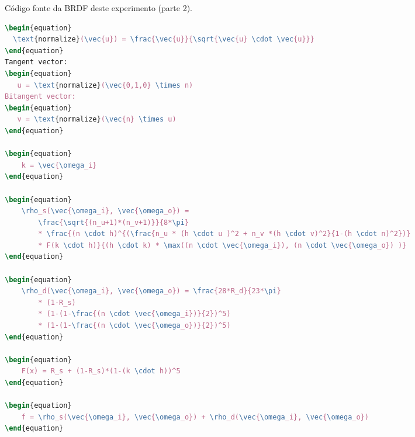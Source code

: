 \begin{codigo}[H]
    \caption{\small Código fonte da BRDF deste experimento (parte 2).}
    \label{cod-ashikhmin-shirley-close-to-original-eqlang-pt-2}
\begin{lstlisting}[language=tex, frame=none, inputencoding=utf8]
\begin{equation}
  \text{normalize}(\vec{u}) = \frac{\vec{u}}{\sqrt{\vec{u} \cdot \vec{u}}}
\end{equation}
Tangent vector:
\begin{equation}
   u = \text{normalize}(\vec{0,1,0} \times n)
Bitangent vector:
\begin{equation}
   v = \text{normalize}(\vec{n} \times u)
\end{equation}

\begin{equation}
    k = \vec{\omega_i}
\end{equation}

\begin{equation}
    \rho_s(\vec{\omega_i}, \vec{\omega_o}) =
        \frac{\sqrt{(n_u+1)*(n_v+1)}}{8*\pi}
        * \frac{(n \cdot h)^{(\frac{n_u * (h \cdot u )^2 + n_v *(h \cdot v)^2}{1-(h \cdot n)^2})}
        * F(k \cdot h)}{(h \cdot k) * \max((n \cdot \vec{\omega_i}), (n \cdot \vec{\omega_o}) )}
\end{equation}

\begin{equation}
    \rho_d(\vec{\omega_i}, \vec{\omega_o}) = \frac{28*R_d}{23*\pi}
        * (1-R_s)
        * (1-(1-\frac{(n \cdot \vec{\omega_i})}{2})^5)
        * (1-(1-\frac{(n \cdot \vec{\omega_o})}{2})^5)
\end{equation}

\begin{equation}
    F(x) = R_s + (1-R_s)*(1-(k \cdot h))^5
\end{equation}

\begin{equation}
    f = \rho_s(\vec{\omega_i}, \vec{\omega_o}) + \rho_d(\vec{\omega_i}, \vec{\omega_o})
\end{equation}
\end{lstlisting}
\end{codigo}
